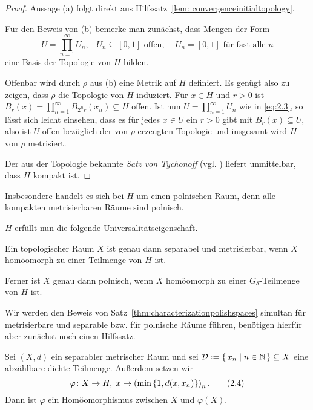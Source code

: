 \documentclass[../main/main.tex]{subfiles}
\begin{document}
	\begin{proof}
		Aussage (a) folgt direkt aus Hilfssatz~\ref{lem: convergenceinitialtopology}.
		
		Für den Beweis von (b) bemerke man zunächst, dass Mengen der Form 
		\[U = \prod_{n=1}^{\infty} U_n\text{,} \quad U_n \subseteq [0, 1] \text{ offen, }
		\quad U_n = [0, 1] \text{ für fast alle } n \label{eq:2.3} \tag{2.3}\]
		eine Basis der Topologie von $H$ bilden.
		
		Offenbar wird durch $\rho$ aus (b) eine Metrik auf $H$ definiert. 
		Es genügt also zu zeigen, dass $\rho$ die Topologie von $H$ induziert. 
		Für $x \in H$ und $r > 0$ ist 
		$B_r(x) = \prod_{n=1}^{\infty} B_{2^n r}(x_n) \subseteq H$ 
		offen. Ist nun $U = \prod_{n=1}^{\infty} U_n$ wie in \eqref{eq:2.3}, 
		so lässt sich leicht einsehen, dass es für jedes $x \in U$ ein $r > 0$ 
		gibt mit $B_r(x) \subseteq U$, also ist $U$ offen bezüglich der von $\rho$ 
		erzeugten Topologie und insgesamt wird $H$ von $\rho$ metrisiert.
		
		Der aus der Topologie bekannte \emph{Satz von Tychonoff} (vgl. \cite[Satz 2.7.1]{Simon.2015}) liefert 
		unmittelbar, dass $H$ kompakt ist.
	\end{proof}

	\begin{Bemerkung}
		Insbesondere handelt es sich bei $H$ um einen polnischen Raum, denn alle kompakten metrisierbaren Räume sind polnisch.
	\end{Bemerkung}
	
	$H$ erfüllt nun die folgende Universalitätseigenschaft.
	
	\begin{Satz}
		\label{thm:characterizationpolishspaces}
		Ein topologischer Raum $X$ ist genau dann separabel und metrisierbar, wenn $X$ homöomorph zu einer Teilmenge von $H$ ist.
		
		Ferner ist $X$ genau dann polnisch, wenn $X$ homöomorph zu einer $G_\delta$-Teilmenge von $H$ ist.
	\end{Satz}
	
	Wir werden den Beweis von Satz~\ref{thm:characterizationpolishspaces} simultan für metrisierbare und 
	separable bzw. für polnische Räume führen, benötigen hierfür aber zunächst noch einen Hilfssatz.
	
	\begin{Hilfssatz}
		\label{lem:characterizationpolishspaces}
		Sei $(X, d)$ ein separabler metrischer Raum und sei 
		$\mathcal{D} \vcentcolon = \left\{\, x_n \; \middle| \; n \in \mathbb{N} \,\right\} \subseteq X$ eine abzählbare 
		dichte Teilmenge. Außerdem setzen wir
		\[\varphi \colon X \to H, \; x \mapsto \left(\min \left\{1, d(x, x_n)\right\} \right)_n  \text{.} \label{eq:2.4} \tag{2.4}\]
		Dann ist $\varphi$ ein Homöomorphismus zwischen $X$ und $\varphi(X)$.
	\end{Hilfssatz}
	
\end{document}
